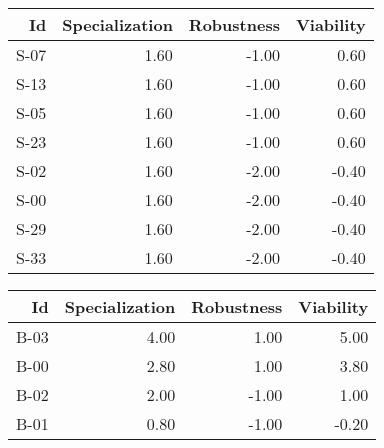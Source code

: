 


\begin{tabular}{ | r | r | r | r | }
    \hline
                    Id  &  Specialization  &      Robustness  &       Viability  \\
    \hline
    \hline
                  S-07  &            1.60  &           -1.00  &            0.60  \\
    \hline
                  S-13  &            1.60  &           -1.00  &            0.60  \\
    \hline
                  S-05  &            1.60  &           -1.00  &            0.60  \\
    \hline
                  S-23  &            1.60  &           -1.00  &            0.60  \\
    \hline
                  S-02  &            1.60  &           -2.00  &           -0.40  \\
    \hline
                  S-00  &            1.60  &           -2.00  &           -0.40  \\
    \hline
                  S-29  &            1.60  &           -2.00  &           -0.40  \\
    \hline
                  S-33  &            1.60  &           -2.00  &           -0.40  \\
    \hline
\end{tabular}


\begin{tabular}{ | r | r | r | r | }
    \hline
                    Id  &  Specialization  &      Robustness  &       Viability  \\
    \hline
    \hline
                  B-03  &            4.00  &            1.00  &            5.00  \\
    \hline
                  B-00  &            2.80  &            1.00  &            3.80  \\
    \hline
                  B-02  &            2.00  &           -1.00  &            1.00  \\
    \hline
                  B-01  &            0.80  &           -1.00  &           -0.20  \\
    \hline
\end{tabular}


